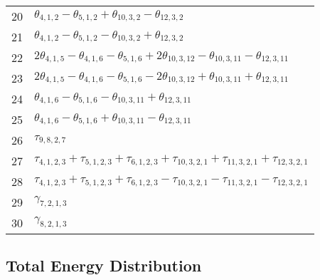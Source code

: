 \documentclass[10pt,oneside]{article}
\begin{document}
\begin{table}[h!]
\begin{tabular}{ll}
  20  & $\theta_{4,1,2} - \theta_{5,1,2} + \theta_{10,3,2} - \theta_{12,3,2}$ \\
  21  & $\theta_{4,1,2} - \theta_{5,1,2} - \theta_{10,3,2} + \theta_{12,3,2}$ \\
  22  & $2\theta_{4,1,5} - \theta_{4,1,6} - \theta_{5,1,6} + 2\theta_{10,3,12} - \theta_{10,3,11} - \theta_{12,3,11}$ \\
  23  & $2\theta_{4,1,5} - \theta_{4,1,6} - \theta_{5,1,6} - 2\theta_{10,3,12} + \theta_{10,3,11} + \theta_{12,3,11}$ \\
  24  & $\theta_{4,1,6} - \theta_{5,1,6} - \theta_{10,3,11} + \theta_{12,3,11}$ \\
  25  & $\theta_{4,1,6} - \theta_{5,1,6} + \theta_{10,3,11} - \theta_{12,3,11}$ \\
  26  & $\tau_{9,8,2,7}$ \\
  27  & $\tau_{4,1,2,3} + \tau_{5,1,2,3} + \tau_{6,1,2,3} + \tau_{10,3,2,1} + \tau_{11,3,2,1} + \tau_{12,3,2,1}$ \\
  28  & $\tau_{4,1,2,3} + \tau_{5,1,2,3} + \tau_{6,1,2,3} - \tau_{10,3,2,1} - \tau_{11,3,2,1} - \tau_{12,3,2,1}$ \\
  29  & $\gamma_{7,2,1,3}$ \\
  30  & $\gamma_{8,2,1,3}$ \\
\bottomrule
\end{tabular}
\end{table}

\begin{table}
\subsection*{Total Energy Distribution}
\centering\end{table}

\clearpage

\subsection{}
\end{document}
